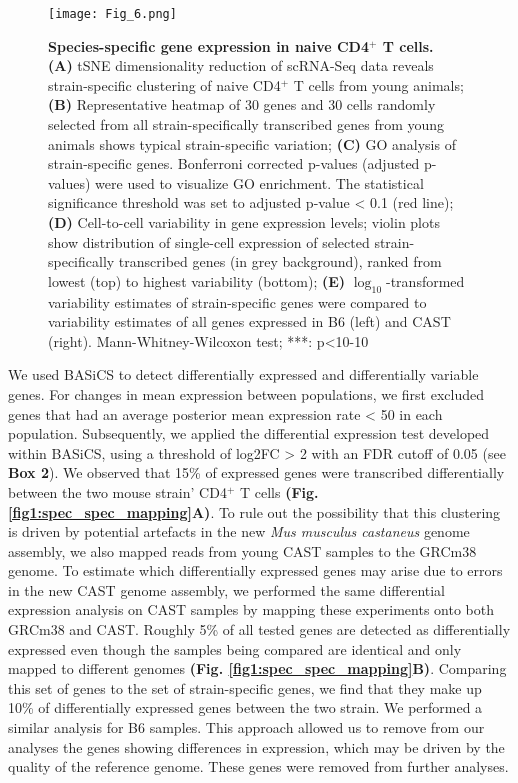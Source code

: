 \begin{figure}[!h]
\centering
\texttt{[image: Fig\_6.png]}
\caption[Species-specific gene expression in naive CD4$^+$ T cells]{\textbf{Species-specific gene expression in naive CD4$^+$ T cells.}\\
\textbf{(A)} tSNE dimensionality reduction of scRNA-Seq data reveals strain-specific clustering of naive CD4$^+$ T cells from young animals; \textbf{(B)} Representative heatmap of 30 genes and 30 cells randomly selected from all strain-specifically transcribed genes from young animals shows typical strain-specific variation; \textbf{(C)}  GO analysis of strain-specific genes. Bonferroni corrected p-values (adjusted p-values) were used to visualize GO enrichment. The statistical significance threshold was set to adjusted p-value < 0.1 (red line); \textbf{(D)} Cell-to-cell variability in gene expression levels; violin plots show distribution of single-cell expression of selected strain-specifically transcribed genes (in grey background), ranked from lowest (top) to highest variability (bottom); \textbf{(E)} $\log_10$-transformed variability estimates of strain-specific genes were compared to variability estimates of all genes expressed in B6 (left) and CAST (right). Mann-Whitney-Wilcoxon test; ***: p<10-10}
\label{fig1:strain_specific}
\end{figure}

\newpage

We used BASiCS to detect differentially expressed and differentially variable genes. For changes in mean expression between populations, we first excluded genes that had an average posterior mean expression rate < 50 in each population. Subsequently, we applied the differential expression test developed within BASiCS, using a threshold of log2FC > 2 with an FDR cutoff of 0.05 (see \textbf{Box 2}). We observed that 15\% of expressed genes were transcribed differentially between the two mouse strain’ CD4$^+$ T cells \textbf{(Fig. \ref{fig1:spec_spec_mapping}A)}. To rule out the possibility that this clustering is driven by potential artefacts in the new \textit{Mus musculus castaneus} genome assembly, we also mapped reads from young CAST samples to the GRCm38 genome. To estimate which differentially expressed genes may arise due to errors in the new CAST genome assembly, we performed the same differential expression analysis on CAST samples by mapping these experiments onto both GRCm38 and CAST. Roughly 5\% of all tested genes are detected as differentially expressed even though the samples being compared are identical and only mapped to different genomes \textbf{(Fig. \ref{fig1:spec_spec_mapping}B)}. Comparing this set of genes to the set of strain-specific genes, we find that they make up 10\% of differentially expressed genes between the two strain. We performed a similar analysis for B6 samples. This approach allowed us to remove from our analyses the genes showing differences in expression, which may be driven by the quality of the reference genome. These genes were removed from further analyses.

